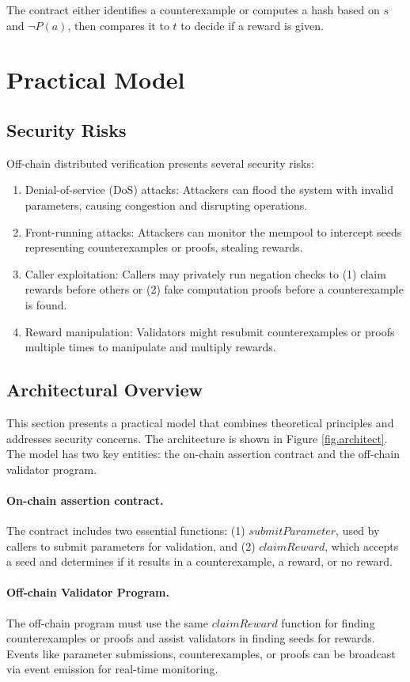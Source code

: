 \documentclass[runningheads]{llncs}
\begin{document}
The contract either identifies a counterexample or computes a hash based on \( s \) and \( \neg P(a) \), then compares it to \( t \) to decide if a reward is given.
\section{Practical Model}
\label{sec:practical-model}
\subsection{Security Risks}
Off-chain distributed verification presents several security risks:
\begin{enumerate}
\item Denial-of-service (DoS) attacks: Attackers can flood the system with invalid parameters, causing congestion and disrupting operations.
\item Front-running attacks: Attackers can monitor the mempool to intercept seeds representing counterexamples or proofs, stealing rewards.
\item Caller exploitation: Callers may privately run negation checks to (1) claim rewards before others or (2) fake computation proofs before a counterexample is found.
\item Reward manipulation: Validators might resubmit counterexamples or proofs multiple times to manipulate and multiply rewards.
\end{enumerate}
\subsection{Architectural Overview}
This section presents a practical model that combines theoretical principles and addresses security concerns. The architecture is shown in Figure \ref{fig.architect}.
The model has two key entities: the on-chain assertion contract and the off-chain validator program. 
\paragraph{On-chain assertion contract.} The contract includes two essential functions: (1) \( submitParameter \), used by callers to submit parameters for validation, and (2) \( claimReward \), which accepts a seed and determines if it results in a counterexample, a reward, or no reward.
\paragraph{Off-chain Validator Program.}
The off-chain program must use the same \( claimReward \) function for finding counterexamples or proofs and assist validators in finding seeds for rewards. Events like parameter submissions, counterexamples, or proofs can be broadcast via event emission for real-time monitoring.
\end{document}
